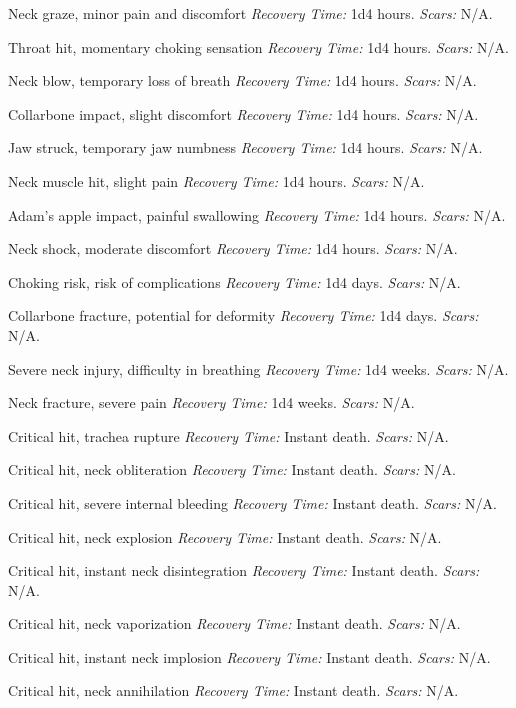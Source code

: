\documentclass[12pt]{book}  %
\begin{document}
\begin{description}[labelwidth=1.5em, leftmargin=*, itemsep=0.4em]
    \item[1 -] Neck graze, minor pain and discomfort \textit{Recovery Time:} 1d4 hours. \textit{Scars:} N/A.
    \item[2 -] Throat hit, momentary choking sensation \textit{Recovery Time:} 1d4 hours. \textit{Scars:} N/A.
    \item[3 -] Neck blow, temporary loss of breath \textit{Recovery Time:} 1d4 hours. \textit{Scars:} N/A.
    \item[4 -] Collarbone impact, slight discomfort \textit{Recovery Time:} 1d4 hours. \textit{Scars:} N/A.
    \item[5 -] Jaw struck, temporary jaw numbness \textit{Recovery Time:} 1d4 hours. \textit{Scars:} N/A.
    \item[6 -] Neck muscle hit, slight pain \textit{Recovery Time:} 1d4 hours. \textit{Scars:} N/A.
    \item[7 -] Adam's apple impact, painful swallowing \textit{Recovery Time:} 1d4 hours. \textit{Scars:} N/A.
    \item[8 -] Neck shock, moderate discomfort \textit{Recovery Time:} 1d4 hours. \textit{Scars:} N/A.
    \item[9 -] Choking risk, risk of complications \textit{Recovery Time:} 1d4 days. \textit{Scars:} N/A.
    \item[10 -] Collarbone fracture, potential for deformity \textit{Recovery Time:} 1d4 days. \textit{Scars:} N/A.
    \item[11 -] Severe neck injury, difficulty in breathing \textit{Recovery Time:} 1d4 weeks. \textit{Scars:} N/A.
    \item[12 -] Neck fracture, severe pain \textit{Recovery Time:} 1d4 weeks. \textit{Scars:} N/A.
    \item[13 -] Critical hit, trachea rupture \textit{Recovery Time:} Instant death. \textit{Scars:} N/A.
    \item[14 -] Critical hit, neck obliteration \textit{Recovery Time:} Instant death. \textit{Scars:} N/A.
    \item[15 -] Critical hit, severe internal bleeding \textit{Recovery Time:} Instant death. \textit{Scars:} N/A.
    \item[16 -] Critical hit, neck explosion \textit{Recovery Time:} Instant death. \textit{Scars:} N/A.
    \item[17 -] Critical hit, instant neck disintegration \textit{Recovery Time:} Instant death. \textit{Scars:} N/A.
    \item[18 -] Critical hit, neck vaporization \textit{Recovery Time:} Instant death. \textit{Scars:} N/A.
    \item[19 -] Critical hit, instant neck implosion \textit{Recovery Time:} Instant death. \textit{Scars:} N/A.
    \item[20 -] Critical hit, neck annihilation \textit{Recovery Time:} Instant death. \textit{Scars:} N/A.
\end{description}
\end{document}
